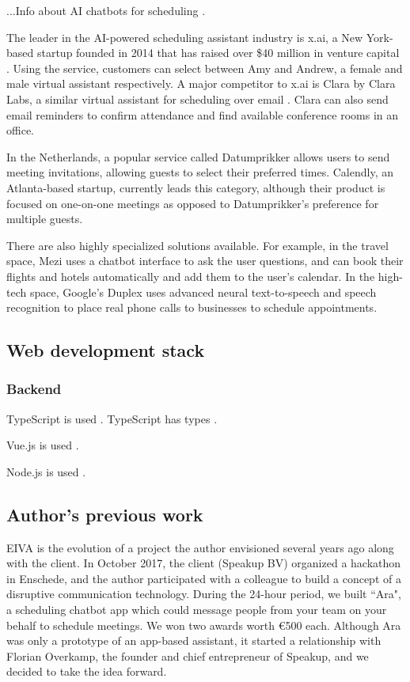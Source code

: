 \documentclass{article}
\begin{document}
...Info about AI chatbots for scheduling \cite{noauthor_ai_nodate}.

The leader in the AI-powered scheduling assistant industry is x.ai, a New York-based startup founded in 2014 that has raised over \$40 million in venture capital \cite{noauthor_x.ais_2018}. Using the service, customers can select between Amy and Andrew, a female and male virtual assistant respectively. A major competitor to x.ai is Clara by Clara Labs, a similar virtual assistant for scheduling over email \cite{noauthor_clara_nodate}. Clara can also send email reminders to confirm attendance and find available conference rooms in an office.

In the Netherlands, a popular service called Datumprikker allows users to send meeting invitations, allowing guests to select their preferred times. Calendly, an Atlanta-based startup, currently leads this category, although their product is focused on one-on-one meetings as opposed to Datumprikker's preference for multiple guests.

There are also highly specialized solutions available. For example, in the travel space, Mezi uses a chatbot interface to ask the user questions, and can book their flights and hotels automatically and add them to the user's calendar. In the high-tech space, Google's Duplex uses advanced neural text-to-speech and speech recognition to place real phone calls to businesses to schedule appointments.

\subsection{Web development stack}

\subsubsection{Backend}

TypeScript is used \cite{hutchison_understanding_2014}. TypeScript has types \cite{huisman_inference_2017}.

Vue.js is used \cite{deng_development_2020}.

Node.js is used \cite{kaimer_return_2018}.

\subsection{Author's previous work}

EIVA is the evolution of a project the author envisioned several years ago along with the client. In October 2017, the client (Speakup BV) organized a hackathon in Enschede, and the author participated with a colleague to build a concept of a disruptive communication technology. During the 24-hour period, we built ``Ara", a scheduling chatbot app which could message people from your team on your behalf to schedule meetings. We won two awards worth €500 each. Although Ara was only a prototype of an app-based assistant, it started a relationship with Florian Overkamp, the founder and chief entrepreneur of Speakup, and we decided to take the idea forward.
\end{document}
